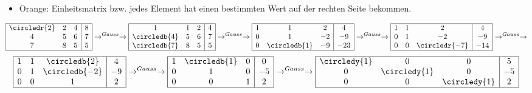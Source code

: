 \begin{itemize}
\begin{itemize}
				\item Orange: Einheitsmatrix bzw. jedes Element hat einen bestimmten Wert auf der rechten Seite bekommen.
			\end{itemize}
			\begin{equation*}
				\begin{array}{|ccc|c|}
					\hline		
					\circledr{2} & 2 & 4 & 8 \\
					4 & 5 & 6 & 7 \\
					7 & 8 & 5 & 5 \\
					\hline
				\end{array}
				\rightarrow^{Gauss} \rightarrow
				\begin{array}{|ccc|c|}
				\hline		
					1 & 1 & 2 & 4 \\
					\circledb{4} & 5 & 6 & 7 \\
					\circledb{7} & 8 & 5 & 5 \\
				\hline
				\end{array}
				\rightarrow^{Gauss} \rightarrow
				\begin{array}{|ccc|c|}
				\hline		
					1 & 1 & 2 & 4 \\
					0 & 1 & -2 & -9 \\
					0 & \circledb{1} & -9 & -23 \\
				\hline
				\end{array}
				\rightarrow^{Gauss} \rightarrow
				\begin{array}{|ccc|c|}
				\hline		
					1 & 1 & 2 & 4 \\
					0 & 1 & -2 & -9 \\
					0 & 0 & \circledr{-7} & -14 \\
				\hline
				\end{array}
				\rightarrow^{Gauss} \rightarrow
			\end{equation*}
			\begin{equation*}
				\begin{array}{|ccc|c|}
				\hline		
					1 & 1 & \circledb{2} & 4 \\
					0 & 1 & \circledb{-2} & -9 \\
					0 & 0 & 1 & 2 \\
				\hline
				\end{array}
				\rightarrow^{Gauss} \rightarrow
				\begin{array}{|ccc|c|}
				\hline		
					1 & \circledb{1} & 0 & 0 \\
					0 & 1 & 0 & -5 \\
					0 & 0 & 1 & 2 \\
				\hline
				\end{array}
				\rightarrow^{Gauss} \rightarrow
				\begin{array}{|ccc|c|}
				\hline		
					\circledy{1} & 0 & 0 & 5 \\
					0 & \circledy{1} & 0 & -5 \\
					0 & 0 & \circledy{1} & 2 \\
				\hline
				\end{array}
			\end{equation*}
	\end{itemize}